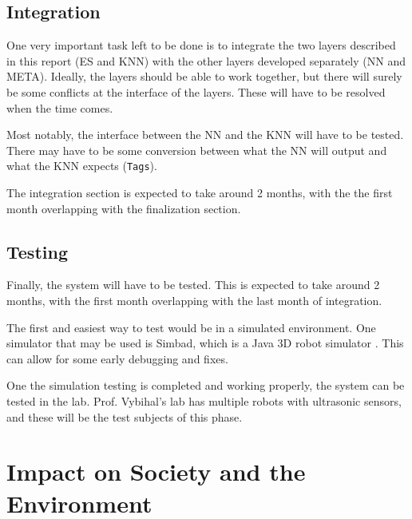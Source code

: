 \documentclass[titlepage,11pt]{article}
\newcommand{\code}[1]{\texttt{#1}}
\begin{document}
\subsection{Integration}

One very important task left to be done is to integrate the two layers described in this report (ES and KNN) with the other layers developed separately (NN and META). Ideally, the layers should be able to work together, but there will surely be some conflicts at the interface of the layers. These will have to be resolved when the time comes.

Most notably, the interface between the NN and the KNN will have to be tested. There may have to be some conversion between what the NN will output and what the KNN expects (\code{Tags}).

The integration section is expected to take around 2 months, with the the first month overlapping with the finalization section.

\subsection{Testing}

Finally, the system will have to be tested. This is expected to take around 2 months, with the first month overlapping with the last month of integration.

The first and easiest way to test would be in a simulated environment. One simulator that may be used is Simbad, which is a Java 3D robot simulator \cite{simbad}. This can allow for some early debugging and fixes.

One the simulation testing is completed and working properly, the system can be tested in the lab. Prof. Vybihal's lab has multiple robots with ultrasonic sensors, and these will be the test subjects of this phase.

\section{Impact on Society and the Environment}
\end{document}

